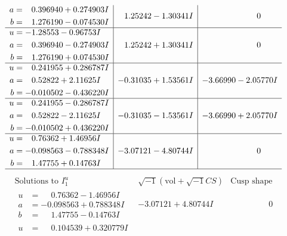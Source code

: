\documentclass[1p]{elsarticle_modified}
\theoremstyle{definition}
\newcommand{\I}{\sqrt{-1}}
\begin{document}
$$\begin{array}{c|c|c}
\begin{aligned}
a &= \phantom{-}0.396940 + 0.274903 I \\
b &= \phantom{-}1.276190 - 0.074530 I\end{aligned}
 & \phantom{-}1.25242 - 1.30341 I & \phantom{-0.000000 } 0 \\ \hline\begin{aligned}
u &= -1.28553 - 0.96753 I \\
a &= \phantom{-}0.396940 - 0.274903 I \\
b &= \phantom{-}1.276190 + 0.074530 I\end{aligned}
 & \phantom{-}1.25242 + 1.30341 I & \phantom{-0.000000 } 0 \\ \hline\begin{aligned}
u &= \phantom{-}0.241955 + 0.286787 I \\
a &= \phantom{-}0.52822 + 2.11625 I \\
b &= -0.010502 - 0.436220 I\end{aligned}
 & -0.31035 + 1.53561 I & -3.66990 - 2.05770 I \\ \hline\begin{aligned}
u &= \phantom{-}0.241955 - 0.286787 I \\
a &= \phantom{-}0.52822 - 2.11625 I \\
b &= -0.010502 + 0.436220 I\end{aligned}
 & -0.31035 - 1.53561 I & -3.66990 + 2.05770 I \\ \hline\begin{aligned}
u &= \phantom{-}0.76362 + 1.46956 I \\
a &= -0.098563 - 0.788348 I \\
b &= \phantom{-}1.47755 + 0.14763 I\end{aligned}
 & -3.07121 - 4.80744 I & \phantom{-0.000000 } 0\\
 \hline 
 \end{array}$$\newpage$$\begin{array}{c|c|c}  
\text{Solutions to }I^u_{1}& \I (\text{vol} + \sqrt{-1}CS) & \text{Cusp shape}\\
 \hline 
\begin{aligned}
u &= \phantom{-}0.76362 - 1.46956 I \\
a &= -0.098563 + 0.788348 I \\
b &= \phantom{-}1.47755 - 0.14763 I\end{aligned}
 & -3.07121 + 4.80744 I & \phantom{-0.000000 } 0 \\ \hline\begin{aligned}
u &= \phantom{-}0.104539 + 0.320779 I \\

\end{aligned}
\end{array}$$
\end{document}
